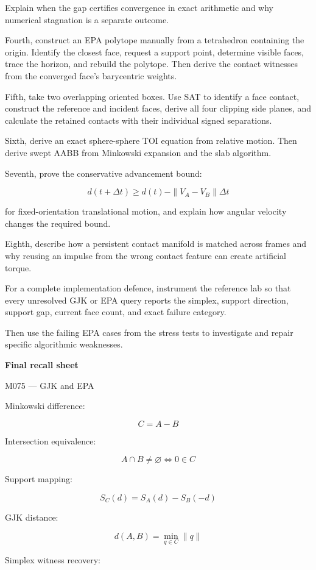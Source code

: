 Explain when the gap certifies convergence in exact arithmetic and why numerical stagnation is a separate outcome.

Fourth, construct an EPA polytope manually from a tetrahedron containing the origin. Identify the closest face, request a support point, determine visible faces, trace the horizon, and rebuild the polytope. Then derive the contact witnesses from the converged face's barycentric weights.

Fifth, take two overlapping oriented boxes. Use SAT to identify a face contact, construct the reference and incident faces, derive all four clipping side planes, and calculate the retained contacts with their individual signed separations.

Sixth, derive an exact sphere-sphere TOI equation from relative motion. Then derive swept AABB from Minkowski expansion and the slab algorithm.

Seventh, prove the conservative advancement bound:

\[
d(t+\Delta t)\ge d(t)-\|V_A-V_B\|\Delta t
\]

for fixed-orientation translational motion, and explain how angular velocity changes the required bound.

Eighth, describe how a persistent contact manifold is matched across frames and why reusing an impulse from the wrong contact feature can create artificial torque.

For a complete implementation defence, instrument the reference lab so that every unresolved GJK or EPA query reports the simplex, support direction, support gap, current face count, and exact failure category.

Then use the failing EPA cases from the stress tests to investigate and repair specific algorithmic weaknesses.

\textbf{Final recall sheet}

M075 --- GJK and EPA

Minkowski difference:

\[
C=A-B
\]

Intersection equivalence:

\[
\boxed{A\cap B\ne\varnothing\iff0\in C}
\]

Support mapping:

\[
\boxed{S_C(d)=S_A(d)-S_B(-d)}
\]

GJK distance:

\[
\boxed{d(A,B)=\min_{q\in C}\|q\|}
\]

Simplex witness recovery:

